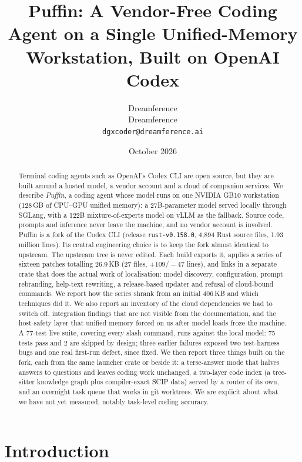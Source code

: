 \documentclass[11pt]{article}
\title{Puffin: A Vendor-Free Coding Agent on a Single Unified-Memory Workstation, Built on
OpenAI Codex}
\author{Dreamference\\
Dreamference\\
\texttt{dgxcoder@dreamference.ai}}
\date{October 2026}
\newcommand{\code}[1]{\texttt{#1}}
\begin{document}
\maketitle

\begin{abstract}
Terminal coding agents such as OpenAI's Codex CLI are open source, but they are built around a
hosted model, a vendor account and a cloud of companion services. We describe \emph{Puffin}, a
coding agent whose model runs on one NVIDIA GB10 workstation (128\,GB of CPU--GPU unified memory):
a 27B-parameter model served locally through SGLang, with a 122B mixture-of-experts model on
vLLM as the fallback. Source code, prompts and
inference never leave the machine, and no vendor account is involved. Puffin is a fork of
the Codex CLI (release \code{rust-v0.158.0}, 4{,}894 Rust source files, 1.93 million lines). Its
central engineering choice is to keep the fork almost identical to upstream. The upstream tree is
never edited. Each build exports it, applies a series of sixteen patches totalling 26.9\,KB (27 files,
$+109/-47$ lines), and links in a separate crate that does the actual work of localisation: model
discovery, configuration, prompt rebranding, help-text rewriting, a release-based updater and
refusal of cloud-bound commands. We report how the series shrank from an initial 406\,KB and which
techniques did it. We also report an inventory of the cloud dependencies we had to switch off,
integration findings that are not visible from the documentation, and the host-safety layer that
unified memory forced on us after model loads froze the machine. A 77-test live suite, covering
every slash command, runs against the local model: 75 tests pass and 2 are skipped by design; three
earlier failures exposed two test-harness bugs and one real first-run defect, since fixed. We then
report three things built on the fork, each from the same launcher crate or beside it: a
terse-answer mode that halves answers to questions and leaves coding work unchanged, a two-layer
code index (a tree-sitter knowledge graph plus compiler-exact SCIP data) served by a router of its
own, and an overnight task queue that works in git worktrees. We are explicit about what we have
not yet measured, notably task-level coding accuracy.
\end{abstract}

\section{Introduction}
\end{document}
